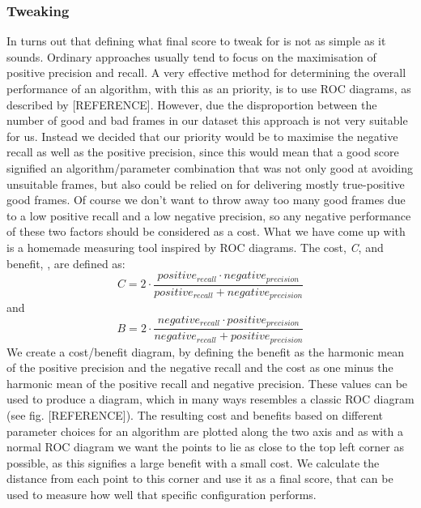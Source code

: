 \documentclass[12pt]{article}
\begin{document}
\subsubsection{Tweaking} \label{sec:ph1tweaking}
%
In turns out that defining what final score to tweak for is not as simple as it sounds. Ordinary approaches usually tend to focus on the maximisation of positive precision and recall. A very effective method for determining the overall performance of an algorithm, with this as an priority, is to use ROC diagrams, as described by [REFERENCE]. However, due the disproportion between the number of good and bad frames in our dataset this approach is not very suitable for us. Instead we decided that our priority would be to maximise the negative recall as well as the positive precision, since this would mean that a good score signified an algorithm/parameter combination that was not only good at avoiding unsuitable frames, but also could be relied on for delivering mostly true-positive good frames. Of course we don't want to throw away too many good frames due to a low positive recall and a low negative precision, so any negative performance of these two factors should be considered as a cost. What we have come up with is a homemade measuring tool inspired by ROC diagrams. The cost, \textit{C}, and benefit, , are defined as:
\[
C = 2 \cdot \frac{positive_{recall} \cdot negative_{precision}}{positive_{recall} + negative_{precision}}
\]
and
\[
B = 2 \cdot \frac{negative_{recall} \cdot positive_{precision}}{negative_{recall} + positive_{precision}}
\]
We create a cost/benefit diagram, by defining the benefit as the harmonic mean of the positive precision and the negative recall and the cost as one minus the harmonic mean of the positive recall and negative precision. These values can be used to produce a diagram, which in many ways resembles a classic ROC diagram (see fig. [REFERENCE]). The resulting cost and benefits based on different parameter choices for an algorithm are plotted along the two axis and as with a normal ROC diagram we want the points to lie as close to the top left corner as possible, as this signifies a large benefit with a small cost. We calculate the distance from each point to this corner and use it as a final score, that can be used to measure how well that specific configuration performs.
%
\end{document}
